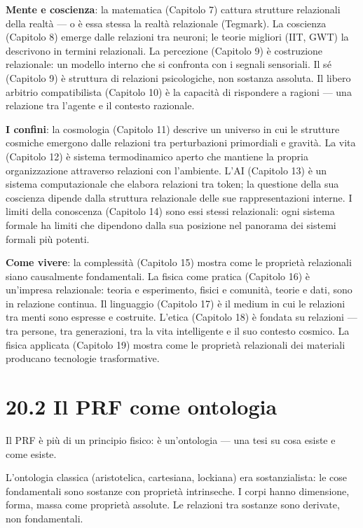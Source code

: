 \documentclass[11.5pt,a4paper,openany]{book}
\theoremstyle{remark}
\begin{document}
\textbf{Mente e coscienza}: la matematica (Capitolo 7) cattura strutture relazionali della realtà --- o è essa stessa la realtà relazionale (Tegmark). La coscienza (Capitolo 8) emerge dalle relazioni tra neuroni; le teorie migliori (IIT, GWT) la descrivono in termini relazionali. La percezione (Capitolo 9) è costruzione relazionale: un modello interno che si confronta con i segnali sensoriali. Il sé (Capitolo 9) è struttura di relazioni psicologiche, non sostanza assoluta. Il libero arbitrio compatibilista (Capitolo 10) è la capacità di rispondere a ragioni --- una relazione tra l'agente e il contesto razionale.

\textbf{I confini}: la cosmologia (Capitolo 11) descrive un universo in cui le strutture cosmiche emergono dalle relazioni tra perturbazioni primordiali e gravità. La vita (Capitolo 12) è sistema termodinamico aperto che mantiene la propria organizzazione attraverso relazioni con l'ambiente. L'AI (Capitolo 13) è un sistema computazionale che elabora relazioni tra token; la questione della sua coscienza dipende dalla struttura relazionale delle sue rappresentazioni interne. I limiti della conoscenza (Capitolo 14) sono essi stessi relazionali: ogni sistema formale ha limiti che dipendono dalla sua posizione nel panorama dei sistemi formali più potenti.

\textbf{Come vivere}: la complessità (Capitolo 15) mostra come le proprietà relazionali siano causalmente fondamentali. La fisica come pratica (Capitolo 16) è un'impresa relazionale: teoria e esperimento, fisici e comunità, teorie e dati, sono in relazione continua. Il linguaggio (Capitolo 17) è il medium in cui le relazioni tra menti sono espresse e costruite. L'etica (Capitolo 18) è fondata su relazioni --- tra persone, tra generazioni, tra la vita intelligente e il suo contesto cosmico. La fisica applicata (Capitolo 19) mostra come le proprietà relazionali dei materiali producano tecnologie trasformative.

\section{20.2 Il PRF come ontologia}

Il PRF è più di un principio fisico: è un'ontologia --- una tesi su cosa esiste e come esiste.

L'ontologia classica (aristotelica, cartesiana, lockiana) era sostanzialista: le cose fondamentali sono sostanze con proprietà intrinseche. I corpi hanno dimensione, forma, massa come proprietà assolute. Le relazioni tra sostanze sono derivate, non fondamentali.
\end{document}
